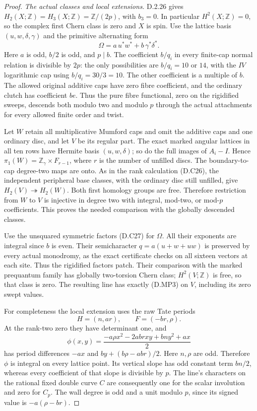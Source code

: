 \begin{proof}
\emph{The actual classes and local extensions.}
D.2.26 gives $H_2(X;\mathbb Z)=H_3(X;\mathbb Z)=\mathbb Z/(2p)$,
with $b_3=0$. In particular $H^2(X;\mathbb Z)=0$, so the complex
first Chern class is zero and $X$ is spin. Use the lattice basis
$(u,w,\delta,\gamma)$ and the primitive alternating form
\[
             \Omega=a\,u^*w^*+b\,\gamma^*\delta^*.
                                                        \tag{D.MP3}
\]
Here $a$ is odd, $b/2$ is odd, and $p\mid b$. The coefficient
$b/q_i$ in every finite-cap normal relation is divisible by $2p$:
the only possibilities are $b/q_i=10$ or $14$, with the $IV$
logarithmic cap using $b/q_i=30/3=10$. The other coefficient is
a multiple of $b$. The allowed original additive caps have zero
fibre coefficient, and the ordinary clutch has coefficient $be$.
Thus the pure fibre functional, zero on the rigidified sweeps,
descends both modulo two and modulo $p$ through the actual
attachments for every allowed finite order and twist.

Let $W$ retain all multiplicative Mumford caps and omit the additive
caps and one ordinary disc, and let $V$ be its regular part. The
exact marked angular lattices in all ten rows have Hermite basis
$(u,w,\delta)$; so do the full images of $A_i-I$. Hence
$\pi_1(W)=\mathbb Z_\gamma\times F_{r-1}$, where $r$ is the number
of unfilled discs. The boundary-to-cap degree-two maps are onto.
As in the rank calculation (D.C26), the independent peripheral
base classes, with the ordinary disc still unfilled, give
$H_2(V)\twoheadrightarrow H_2(W)$. Both first homology groups are
free. Therefore restriction from $W$ to $V$ is injective in degree
two with integral, mod-two, or mod-$p$ coefficients. This proves
the needed comparison with the globally descended classes.

Use the unsquared symmetric factors (D.C27) for $\Omega$.
All their exponents are integral since $b$ is even. Their
semicharacter $q=a(u+w+uw)$ is preserved by every actual
monodromy, as the exact certificate checks on all sixteen
vectors at each site. Thus the rigidified factors patch.
Their comparison with the marked prequantum family has globally
two-torsion Chern class; $H^2(V;\mathbb Z)$ is free, so that class
is zero. The resulting line has exactly (D.MP3) on $V$,
including its zero swept values.

For completeness the local extension uses the raw Tate periods
\[
 H=(n,ar),\qquad F=(-br,\rho).
\]
At the rank-two zero they have determinant one, and
\[
 \phi(x,y)=\frac{-a\rho x^2-2ab rxy+bn y^2+ax}{2}
                                                        \tag{D.MP4}
\]
has period differences $-ax$ and $by+(b\rho-ab r)/2$.
Here $n,\rho$ are odd. Therefore $\phi$ is integral on every
lattice point. Its vertical slope has odd constant term
$bn/2$, whereas every coefficient of that slope is divisible
by $p$. The line's characters on the rational fixed double
curve $C$ are consequently one for the scalar involution and
zero for $C_p$. The wall degree is odd and a unit modulo $p$,
since its signed value is $-a(\rho-br)$.


\end{proof}
